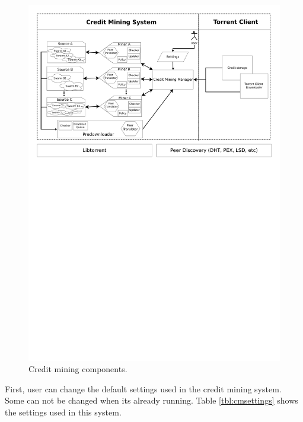 \begin{figure}[ht]
	\centering
	\includegraphics[width=\textwidth]{pics/cm_components.pdf}
	\caption{Credit mining components.}
	\label{fig:cmcomponents}
\end{figure}

First, user can change the default settings used in the credit mining system. Some can not be changed when its already running. Table \ref{tbl:cmsettings} shows the settings used in this system. 

